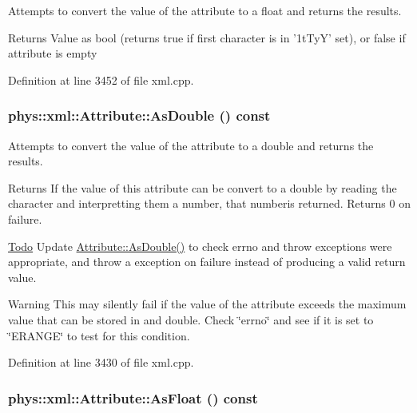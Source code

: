Attempts to convert the value of the attribute to a float and returns the results. 

\begin{DoxyReturn}{Returns}
Value as bool (returns true if first character is in '1tTyY' set), or false if attribute is empty 
\end{DoxyReturn}


Definition at line 3452 of file xml.cpp.

\hypertarget{classphys_1_1xml_1_1Attribute_a467ae167d5407ae3293a22b8873cb43a}{
\subsubsection[{AsDouble}]{\setlength{\rightskip}{0pt plus 5cm}phys::xml::Attribute::AsDouble () const}}
\label{da/ddf/classphys_1_1xml_1_1Attribute_a467ae167d5407ae3293a22b8873cb43a}


Attempts to convert the value of the attribute to a double and returns the results. 

\begin{DoxyReturn}{Returns}
If the value of this attribute can be convert to a double by reading the character and interpretting them a number, that numberis returned. Returns 0 on failure. 
\end{DoxyReturn}
\begin{Desc}
\item[\hyperlink{todo__todo000045}{Todo}]Update \hyperlink{classphys_1_1xml_1_1Attribute_a467ae167d5407ae3293a22b8873cb43a}{Attribute::AsDouble()} to check errno and throw exceptions were appropriate, and throw a exception on failure instead of producing a valid return value. \end{Desc}
\begin{DoxyWarning}{Warning}
This may silently fail if the value of the attribute exceeds the maximum value that can be stored in and double. Check \char`\"{}errno\char`\"{} and see if it is set to \char`\"{}ERANGE\char`\"{} to test for this condition. 
\end{DoxyWarning}


Definition at line 3430 of file xml.cpp.

\hypertarget{classphys_1_1xml_1_1Attribute_aad74f805b9318735011d698ee39113aa}{
\subsubsection[{AsFloat}]{\setlength{\rightskip}{0pt plus 5cm}phys::xml::Attribute::AsFloat () const}}
\label{da/ddf/classphys_1_1xml_1_1Attribute_aad74f805b9318735011d698ee39113aa}


